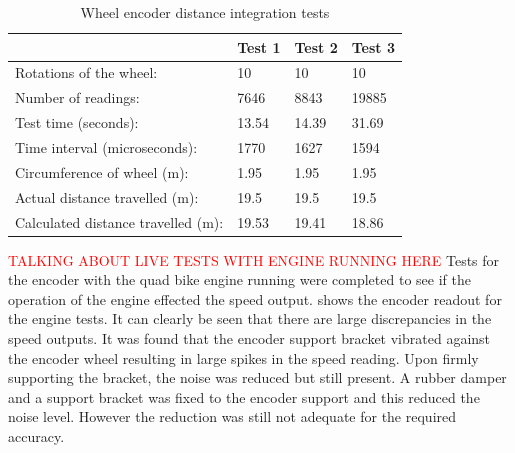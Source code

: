 \documentclass[main.tex]{subfiles}
\begin{document}
\begin{table}[ht]
\centering
\caption{Wheel encoder distance integration tests}
\begin{tabular}{llll}
\toprule
                                   & Test 1 & Test 2 & Test 3 \\ \midrule
Rotations of the wheel:            & 10     & 10     & 10     \\
Number of readings:                & 7646   & 8843   & 19885  \\
Test time (seconds):               & 13.54  & 14.39  & 31.69  \\
Time interval (microseconds):      & 1770   & 1627   & 1594   \\
Circumference of wheel (m):        & 1.95   & 1.95   & 1.95   \\
Actual distance travelled (m):     & 19.5   & 19.5   & 19.5   \\
Calculated distance travelled (m): & 19.53  & 19.41  & 18.86  \\ \bottomrule
\end{tabular}
\end{table}

\textcolor{red}{TALKING ABOUT LIVE TESTS WITH ENGINE RUNNING HERE}
Tests for the encoder with the quad bike engine running were completed to see if the operation of the engine effected the speed output.  shows the encoder readout for the engine tests. It can clearly be seen that there are large discrepancies in the speed outputs. It was found that the encoder support bracket vibrated against the encoder wheel resulting in large spikes in the speed reading. Upon firmly supporting the bracket, the noise was reduced but still present. A rubber damper and a support bracket was fixed to the encoder support and this reduced the noise level. However the reduction was still not adequate for the required accuracy. 
\end{document}
